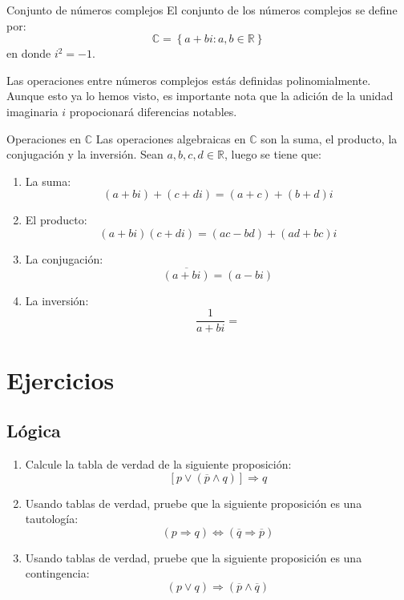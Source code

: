 \documentclass[11pt, twoside]{book}
\newcommand{\set}[1]{\left\lbrace #1 \right\rbrace}
\begin{document}
\begin{definition}{Conjunto de números complejos}
El conjunto de los números complejos se define por:
    \[\mathbb{C}=\set{a+bi: a,b\in\mathbb{R}}\]
    en donde \(i^2=-1\).
\end{definition}

Las operaciones entre números complejos estás definidas polinomialmente. Aunque esto ya lo hemos visto, es importante nota que la adición de la unidad imaginaria \(i\) propocionará diferencias notables.
\begin{proposition}{Operaciones en \(\mathbb{C}\)}
    Las operaciones algebraicas en \(\mathbb{C}\) son la suma, el producto, la conjugación y la inversión. Sean \(a,b,c,d\in\mathbb{R}\), luego se tiene que:
    \begin{enumerate}[label=\roman*)]
        \item La suma:
            \[\left(a+bi\right)+\left(c+di\right)=\left(a+c\right)+\left(b+d\right)i\]
        \item El producto:
            \[\left(a+bi\right)\left(c+di\right)=\left(ac-bd\right)+\left(ad+bc\right)i\]
        \item La conjugación:
        \[\overline{\left(a+bi\right)}=\left(a-bi\right)\]
        \item La inversión:
            \[\frac{1}{a+bi}=\]
    \end{enumerate}
\end{proposition}

\newpage
\section{Ejercicios}
\subsection*{Lógica}
\begin{enumerate}
    \item Calcule la tabla de verdad de la siguiente proposición:
            \[\left[p\vee(\overline{p}\wedge q)\right]\Rightarrow q\]
    \item Usando tablas de verdad, pruebe que la siguiente proposición es una tautología:
        \[\left(p\Rightarrow q\right) \iff \left(\overline{q}\Rightarrow \overline{p}\right)\]
    \item Usando tablas de verdad, pruebe que la siguiente proposición es una contingencia:
        \[(p\vee q) \Rightarrow (\overline{p}\wedge \overline{q})\] 
\end{enumerate}
\end{document}
